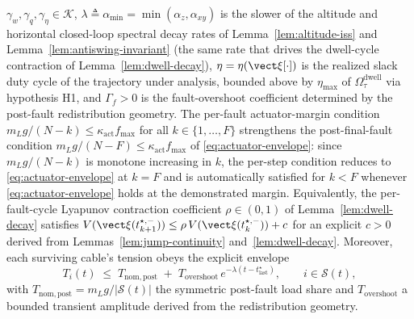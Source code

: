\begin{theorem}
$\gamma_w, \gamma_q, \gamma_\eta \in \mathcal{K}$, $\lambda \triangleq \alpha_{\min} = \min(\alpha_z, \alpha_{xy})$ is the slower of the altitude and horizontal closed-loop spectral decay rates of Lemma~\ref{lem:altitude-iss} and Lemma~\ref{lem:antiswing-invariant} (the same rate that drives the dwell-cycle contraction of Lemma~\ref{lem:dwell-decay}), $\eta = \eta(\vect\xi[\cdot])$ is the realized slack duty cycle of the trajectory under analysis, bounded above by $\eta_{\max}$ of $\Omega^{\mathrm{dwell}}_\tau$ via hypothesis H1, and $\Gamma_f > 0$ is the fault-overshoot coefficient determined by the post-fault redistribution geometry. The per-fault actuator-margin condition $m_L g/(N{-}k) \le \kappa_{\mathrm{act}} f_{\max}$ for all $k \in \{1,\dots,F\}$ strengthens the post-final-fault condition $m_L g/(N{-}F) \le \kappa_{\mathrm{act}} f_{\max}$ of \eqref{eq:actuator-envelope}: since $m_L g/(N{-}k)$ is monotone increasing in $k$, the per-step condition reduces to \eqref{eq:actuator-envelope} at $k = F$ and is automatically satisfied for $k < F$ whenever \eqref{eq:actuator-envelope} holds at the demonstrated margin. Equivalently, the per-fault-cycle Lyapunov contraction coefficient $\rho \in (0,1)$ of Lemma~\ref{lem:dwell-decay} satisfies $V(\vect\xi(t_{k+1}^{\star,-})) \le \rho\,V(\vect\xi(t_k^{\star,-})) + c$ for an explicit $c > 0$ derived from Lemmas~\ref{lem:jump-continuity} and~\ref{lem:dwell-decay}. Moreover, each surviving cable's tension obeys the explicit envelope
\begin{equation}
  T_i(t) \;\le\;
    T_{\mathrm{nom,post}}
    \;+\; T_{\mathrm{overshoot}}\,
    e^{-\lambda(t - t^\star_{\mathrm{last}})},
  \qquad i \in \mathcal{S}(t),
  \label{eq:tension-envelope-thm}
\end{equation}
with $T_{\mathrm{nom,post}} = m_L g/|\mathcal{S}(t)|$ the symmetric post-fault load share and $T_{\mathrm{overshoot}}$ a bounded transient amplitude derived from the redistribution geometry.
\end{theorem}

